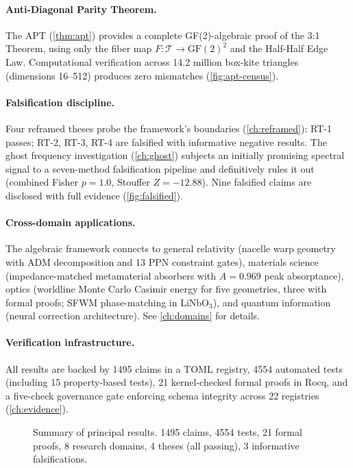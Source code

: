 \documentclass[12pt,openany]{report}
\theoremstyle{definition}
\theoremstyle{plain}
\theoremstyle{remark}
\newcommand{\claimcount}{1495}
\newcommand{\testcount}{4554}
\newcommand{\kernelchecked}{21}
\begin{document}
\paragraph{Anti-Diagonal Parity Theorem.}
The APT (\cref{thm:apt}) provides a complete GF(2)-algebraic proof of
the 3:1 Theorem, using only the fiber map $F: \mathcal{T} \to
\mathrm{GF}(2)^2$ and the Half-Half Edge Law.  Computational
verification across 14.2 million box-kite triangles (dimensions
16--512) produces zero mismatches (\cref{fig:apt-census}).

\paragraph{Falsification discipline.}
Four reframed theses probe the framework's boundaries
(\cref{ch:reframed}): RT-1 passes; RT-2, RT-3, RT-4 are falsified
with informative negative results.  The ghost frequency investigation
(\cref{ch:ghost}) subjects an initially promising spectral signal to
a seven-method falsification pipeline and definitively rules it out
(combined Fisher $p = 1.0$, Stouffer $Z = -12.88$).  Nine falsified
claims are disclosed with full evidence (\cref{fig:falsified}).

\paragraph{Cross-domain applications.}
The algebraic framework connects to general relativity (nacelle warp
geometry with ADM decomposition and 13 PPN constraint gates),
materials science (impedance-matched metamaterial absorbers with
$A = 0.969$ peak absorptance), optics (worldline Monte Carlo Casimir
energy for five geometries, three with formal proofs; SFWM
phase-matching in LiNbO$_3$), and quantum information (neural
correction architecture).  See \cref{ch:domains} for details.

\paragraph{Verification infrastructure.}
All results are backed by \claimcount{} claims in a TOML registry,
\testcount{} automated tests (including 15 property-based tests),
\kernelchecked{} kernel-checked formal proofs in Rocq, and a
five-check governance gate enforcing schema integrity across 22
registries (\cref{ch:evidence}).

\begin{figure}[p]
\centering

\caption{Summary of principal results.  \claimcount{}
claims, \testcount{} tests, \kernelchecked{} formal proofs, 8 research
domains, 4 theses (all passing), 3 informative falsifications.}
\label{fig:summary}
\end{figure}
\end{document}

